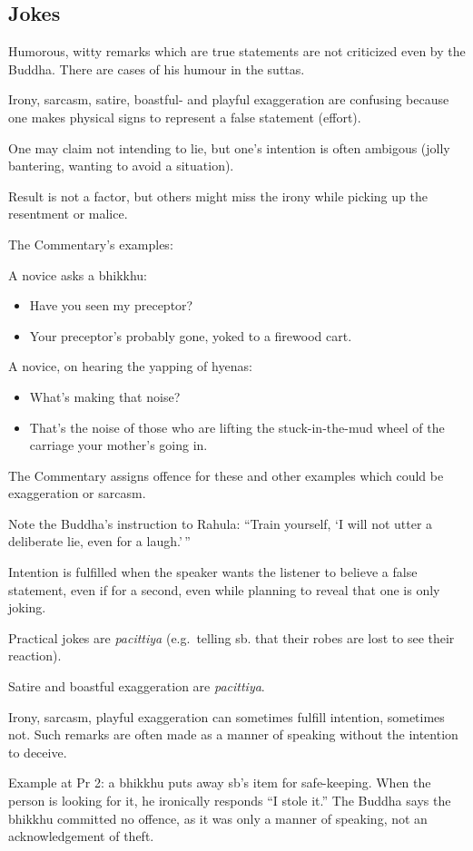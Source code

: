 \subsection{Jokes}

Humorous, witty remarks which are true statements are not criticized
even by the Buddha. There are cases of his humour in the suttas.

Irony, sarcasm, satire, boastful- and playful exaggeration are confusing
because one makes physical signs to represent a false statement
(effort).

One may claim not intending to lie, but one's intention is often
ambigous (jolly bantering, wanting to avoid a situation).

Result is not a factor, but others might miss the irony while picking up
the resentment or malice.

The Commentary's examples:

A novice asks a bhikkhu:

\begin{itemize}
\tightlist
\item
  Have you seen my preceptor?
\item
  Your preceptor's probably gone, yoked to a firewood cart.
\end{itemize}

\clearpage

A novice, on hearing the yapping of hyenas:

\begin{itemize}
\tightlist
\item
  What's making that noise?
\item
  That's the noise of those who are lifting the stuck-in-the-mud wheel
  of the carriage your mother's going in.
\end{itemize}

The Commentary assigns offence for these and other examples which could
be exaggeration or sarcasm.

Note the Buddha's instruction to Rahula: ``Train yourself, `I will not
utter a deliberate lie, even for a laugh.'\,''

Intention is fulfilled when the speaker wants the listener to believe a
false statement, even if for a second, even while planning to reveal
that one is only joking.

Practical jokes are \emph{pacittiya} (e.g.~telling sb. that their robes
are lost to see their reaction).

Satire and boastful exaggeration are \emph{pacittiya}.

Irony, sarcasm, playful exaggeration can sometimes fulfill intention,
sometimes not. Such remarks are often made as a manner of speaking
without the intention to deceive.

Example at Pr 2: a bhikkhu puts away sb's item for safe-keeping. When
the person is looking for it, he ironically responds ``I stole it.'' The
Buddha says the bhikkhu committed no offence, as it was only a manner of
speaking, not an acknowledgement of theft.

